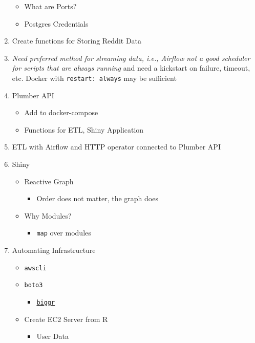 \documentclass[
]{book}
\providecommand{\tightlist}{%
  \setlength{\itemsep}{0pt}\setlength{\parskip}{0pt}}
\begin{document}
\begin{enumerate}
  \begin{itemize}
  \tightlist
  \item
    What are Ports?
  \item
    Postgres Credentials
  \end{itemize}
\item
  Create functions for Storing Reddit Data
\item
  \emph{Need preferred method for streaming data, i.e., Airflow not a good scheduler for scripts that are always running} and need a kickstart on failure, timeout, etc. Docker with \texttt{restart:\ always} may be sufficient
\item
  Plumber API

  \begin{itemize}
  \tightlist
  \item
    Add to docker-compose
  \item
    Functions for ETL, Shiny Application
  \end{itemize}
\item
  ETL with Airflow and HTTP operator connected to Plumber API
\item
  Shiny

  \begin{itemize}
  \tightlist
  \item
    Reactive Graph

    \begin{itemize}
    \tightlist
    \item
      Order does not matter, the graph does
    \end{itemize}
  \item
    Why Modules?

    \begin{itemize}
    \tightlist
    \item
      \texttt{map} over modules
    \end{itemize}
  \end{itemize}
\item
  Automating Infrastructure

  \begin{itemize}
  \tightlist
  \item
    \texttt{awscli}
  \item
    \texttt{boto3}

    \begin{itemize}
    \tightlist
    \item
      \href{https://github.com/fdrennan/ndexr-platform/tree/master/biggr/R}{\texttt{biggr}}
    \end{itemize}
  \item
    Create EC2 Server from R

    \begin{itemize}
    \tightlist
    \item
      User Data
    \end{itemize}
  \end{itemize}
\end{enumerate}

  
\end{document}
